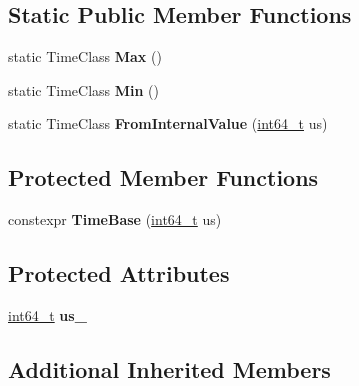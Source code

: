 \subsection*{Static Public Member Functions}
\begin{DoxyCompactItemize}
\item 
\mbox{\label{classv8_1_1base_1_1time__internal_1_1TimeBase_a1be1b2af4f22220c161b6366822e39af}} 
static Time\+Class {\bfseries Max} ()
\item 
\mbox{\label{classv8_1_1base_1_1time__internal_1_1TimeBase_ad77924f02719e479246332068bf81a7f}} 
static Time\+Class {\bfseries Min} ()
\item 
\mbox{\label{classv8_1_1base_1_1time__internal_1_1TimeBase_ab6c61eaafee179c1a0d6ac7913616112}} 
static Time\+Class {\bfseries From\+Internal\+Value} (\mbox{\hyperlink{classint64__t}{int64\+\_\+t}} us)
\end{DoxyCompactItemize}
\subsection*{Protected Member Functions}
\begin{DoxyCompactItemize}
\item 
\mbox{\label{classv8_1_1base_1_1time__internal_1_1TimeBase_a92ad71fc34272ac99612af8bb07ac6e3}} 
constexpr {\bfseries Time\+Base} (\mbox{\hyperlink{classint64__t}{int64\+\_\+t}} us)
\end{DoxyCompactItemize}
\subsection*{Protected Attributes}
\begin{DoxyCompactItemize}
\item 
\mbox{\label{classv8_1_1base_1_1time__internal_1_1TimeBase_a72adcd44d000d2fb8d09c263f7c6529b}} 
\mbox{\hyperlink{classint64__t}{int64\+\_\+t}} {\bfseries us\+\_\+}
\end{DoxyCompactItemize}
\subsection*{Additional Inherited Members}


